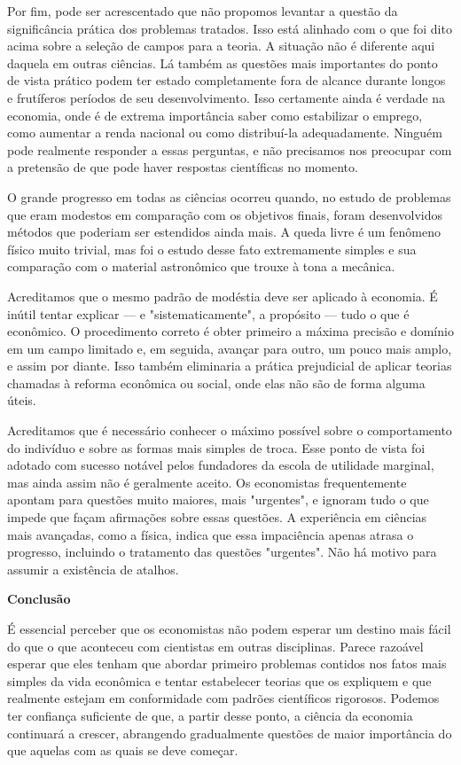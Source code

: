 \documentclass[a4paper,12pt]{article}[abntex2]
\begin{document}
Por fim, pode ser acrescentado que não propomos levantar a questão da significância prática dos problemas tratados. Isso está alinhado com o que foi dito acima sobre a seleção de campos para a teoria. A situação não é diferente aqui daquela em outras ciências. Lá também as questões mais importantes do ponto de vista prático podem ter estado completamente fora de alcance durante longos e frutíferos períodos de seu desenvolvimento. Isso certamente ainda é verdade na economia, onde é de extrema importância saber como estabilizar o emprego, como aumentar a renda nacional ou como distribuí-la adequadamente. Ninguém pode realmente responder a essas perguntas, e não precisamos nos preocupar com a pretensão de que pode haver respostas científicas no momento.

O grande progresso em todas as ciências ocorreu quando, no estudo de problemas que eram modestos em comparação com os objetivos finais, foram desenvolvidos métodos que poderiam ser estendidos ainda mais. A queda livre é um fenômeno físico muito trivial, mas foi o estudo desse fato extremamente simples e sua comparação com o material astronômico que trouxe à tona a mecânica.

Acreditamos que o mesmo padrão de modéstia deve ser aplicado à economia. É inútil tentar explicar — e "sistematicamente", a propósito — tudo o que é econômico. O procedimento correto é obter primeiro a máxima precisão e domínio em um campo limitado e, em seguida, avançar para outro, um pouco mais amplo, e assim por diante. Isso também eliminaria a prática prejudicial de aplicar teorias chamadas à reforma econômica ou social, onde elas não são de forma alguma úteis.

Acreditamos que é necessário conhecer o máximo possível sobre o comportamento do indivíduo e sobre as formas mais simples de troca. Esse ponto de vista foi adotado com sucesso notável pelos fundadores da escola de utilidade marginal, mas ainda assim não é geralmente aceito. Os economistas frequentemente apontam para questões muito maiores, mais "urgentes", e ignoram tudo o que impede que façam afirmações sobre essas questões. A experiência em ciências mais avançadas, como a física, indica que essa impaciência apenas atrasa o progresso, incluindo o tratamento das questões "urgentes". Não há motivo para assumir a existência de atalhos.

\textbf{Conclusão}

É essencial perceber que os economistas não podem esperar um destino mais fácil do que o que aconteceu com cientistas em outras disciplinas. Parece razoável esperar que eles tenham que abordar primeiro problemas contidos nos fatos mais simples da vida econômica e tentar estabelecer teorias que os expliquem e que realmente estejam em conformidade com padrões científicos rigorosos. Podemos ter confiança suficiente de que, a partir desse ponto, a ciência da economia continuará a crescer, abrangendo gradualmente questões de maior importância do que aquelas com as quais se deve começar.
\end{document}
